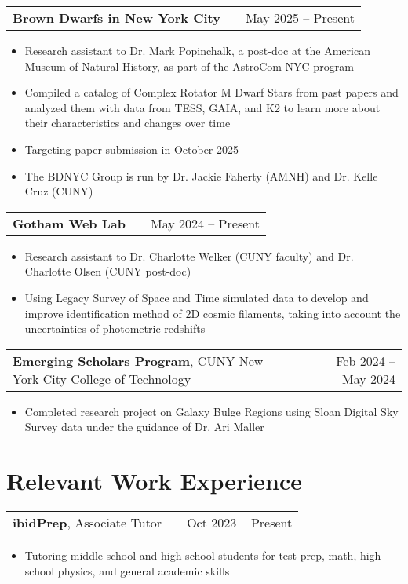 \documentclass[a4paper,12pt]{article}
\makeatletter
\newenvironment{joblong}[2]
    {
    \begin{tabularx}{\linewidth}{@{}l X r@{}}
    #1 & \hfill &  #2 \\[3.75pt]
    \end{tabularx}
    \begin{minipage}[t]{\linewidth}
    \begin{itemize}[nosep,after=\strut, leftmargin=1em, itemsep=3pt,label=--]
    }
    {
    \end{itemize}
    \end{minipage}    
    }
\makeatother
\begin{document}
\begin{joblong}{\textbf{Brown Dwarfs in New York City}}{May 2025 -- Present}
\item Research assistant to Dr. Mark Popinchalk, a post-doc at the American Museum of Natural History, as part of the AstroCom NYC program
\item Compiled a catalog of Complex Rotator M Dwarf Stars from past papers and analyzed them with data from TESS, GAIA, and K2 to learn more about their characteristics and changes over time
\item Targeting paper submission in October 2025
\item The BDNYC Group is run by Dr. Jackie Faherty (AMNH) and Dr. Kelle Cruz (CUNY)
\end{joblong}

\begin{joblong}{\textbf{Gotham Web Lab}}{May 2024 -- Present}
\item Research assistant to Dr. Charlotte Welker (CUNY faculty) and Dr. Charlotte Olsen (CUNY post-doc)
\item Using Legacy Survey of Space and Time simulated data to develop and improve identification method of 2D cosmic filaments, taking into account the uncertainties of photometric redshifts
\end{joblong}

\begin{joblong}{\textbf{Emerging Scholars Program}, CUNY New York City College of Technology}{Feb 2024 -- May 2024}
\item Completed research project on Galaxy Bulge Regions using Sloan Digital Sky Survey data under the guidance of Dr. Ari Maller 
\end{joblong}
  
\section{Relevant Work Experience}

\begin{joblong}{\textbf{ibidPrep}, Associate Tutor}{Oct 2023 -- Present}
\item Tutoring middle school and high school students for test prep, math, high school physics, and general academic skills
\end{joblong}
\end{document}
